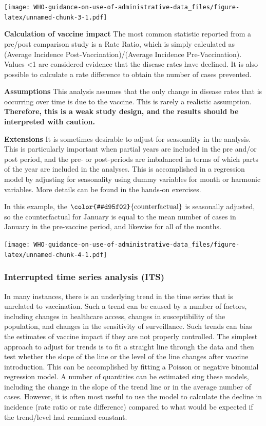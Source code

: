 \documentclass[]{article}
\begin{document}
\texttt{[image: WHO-guidance-on-use-of-administrative-data\_files/figure-latex/unnamed-chunk-3-1.pdf]}

\textbf{Calculation of vaccine impact} The most common statistic
reported from a pre/post comparison study is a Rate Ratio, which is
simply calculated as (Average Incidence Post-Vaccination)/(Average
Incidence Pre-Vaccination). Values \textless{}1 are considered evidence
that the disease rates have declined. It is also possible to calculate a
rate difference to obtain the number of cases prevented.

\textbf{Assumptions} This analysis assumes that the only change in
disease rates that is occurring over time is due to the vaccine. This is
rarely a realistic assumption. \textbf{Therefore, this is a weak study
design, and the results should be interpreted with caution.}

\textbf{Extensions} It is sometimes desirable to adjust for seasonality
in the analysis. This is particularly important when partial years are
included in the pre and/or post period, and the pre- or post-periods are
imbalanced in terms of which parts of the year are included in the
analyses. This is accomplished in a regression model by adjusting for
seasonality using dummy variables for month or harmonic variables. More
details can be found in the hands-on exercises.

In this example, the \(\color{#d95f02}{\text{counterfactual}}\) is
seasonally adjusted, so the counterfactual for January is equal to the
mean number of cases in January in the pre-vaccine period, and likewise
for all of the months.

\texttt{[image: WHO-guidance-on-use-of-administrative-data\_files/figure-latex/unnamed-chunk-4-1.pdf]}

\subsubsection{Interrupted time series analysis
(ITS)}\label{interrupted-time-series-analysis-its}

In many instances, there is an underlying trend in the time series that
is unrelated to vaccination. Such a trend can be caused by a number of
factors, including changes in healthcare access, changes in
susceptibility of the population, and changes in the sensitivity of
surveillance. Such trends can bias the estimates of vaccine impact if
they are not properly controlled. The simplest approach to adjust for
trends is to fit a straight line through the data and then test whether
the slope of the line or the level of the line changes after vaccine
introduction. This can be accomplished by fitting a Poisson or negative
binomial regression model. A number of quantities can be estimated sing
these models, including the change in the slope of the trend line or in
the average number of cases. However, it is often most useful to use the
model to calculate the decline in incidence (rate ratio or rate
difference) compared to what would be expected if the trend/level had
remained constant.
\end{document}

